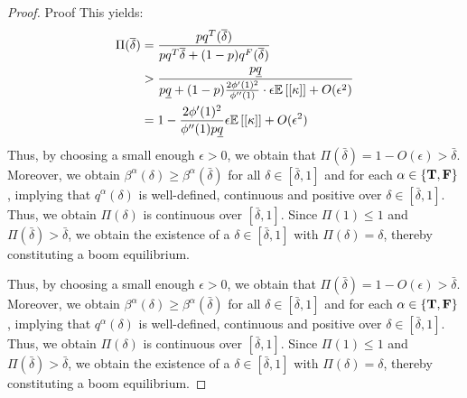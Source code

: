 \begin{proof}{Proof}
This yields: 
\begin{align*}
    \Pi(\overline{\delta}) &= \frac{pq^T (\overline{\delta})}{pq^T \overline{\delta} + (1-p) q^F (\overline{\delta})} \\
    &> \frac{p \underline{q}}{p \underline{q} + (1-p) \frac{2\phi'(1)^2}{\phi''(1)} \cdot \epsilon \mathbb{E}\left[ [\kappa]\right]  + O(\epsilon^2) } \\ 
    &= 1 - \frac{2\phi'(1)^2}{\phi''(1) p \underline{q}}   \epsilon \mathbb{E}\left[ [\kappa]\right]  + O(\epsilon^2) 
\end{align*}
Thus, by choosing a small enough $\epsilon >0$, we obtain that $\Pi(\bar{\delta}) = 1 - O(\epsilon) > \bar{\delta}$. Moreover, we obtain $\beta^\alpha(\delta)  \geq \beta^\alpha(\bar{\delta})$ for all $\delta \in [\bar{\delta}, 1]$ and for each  $\alpha \in \{\mathbf{T}, \mathbf{F}\}$, implying that $q^\alpha(\delta)$ is well-defined, continuous and positive over $\delta \in [\bar{\delta}, 1]$. Thus, we obtain $\Pi(\delta)$ is continuous over $[\bar{\delta}, 1]$. Since $\Pi(1) \leq 1$ and $\Pi(\bar{\delta}) > \bar{\delta}$, we obtain the existence of a $\delta \in [\bar{\delta}, 1]$ with $\Pi(\delta)  = \delta$, thereby constituting a boom equilibrium.


Thus, by choosing a small enough $\epsilon >0$, we obtain that $\Pi(\bar{\delta}) = 1 - O(\epsilon) > \bar{\delta}$. Moreover, we obtain $\beta^\alpha(\delta)  \geq \beta^\alpha(\bar{\delta})$ for all $\delta \in [\bar{\delta}, 1]$ and for each  $\alpha \in \{\mathbf{T}, \mathbf{F}\}$, implying that $q^\alpha(\delta)$ is well-defined, continuous and positive over $\delta \in [\bar{\delta}, 1]$. Thus, we obtain $\Pi(\delta)$ is continuous over $[\bar{\delta}, 1]$. Since $\Pi(1) \leq 1$ and $\Pi(\bar{\delta}) > \bar{\delta}$, we obtain the existence of a $\delta \in [\bar{\delta}, 1]$ with $\Pi(\delta)  = \delta$, thereby constituting a boom equilibrium.


\end{proof}